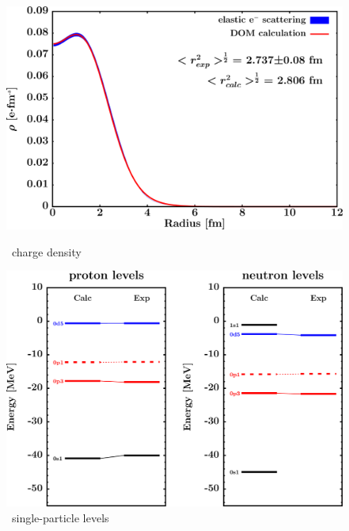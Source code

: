 \begin{figure}[hbtp]
    \centering
    \begin{minipage}{0.42\textwidth}
        \centering
        \includegraphics[width=\textwidth]{figures/o16_chargeDensity.png}
        \caption*{\oSix\ charge density}
        \label{DOMFitData_o16_chargeDensity}
    \end{minipage}\hspace{6pt}
    \begin{minipage}{0.42\textwidth}
        \centering
        \includegraphics[width=\textwidth]{figures/o16_SPLevels.png}
        \caption*{\oSix\ single-particle levels}
        \label{DOMFitData_o16_SPLevels}
    \end{minipage}
\end{figure}

